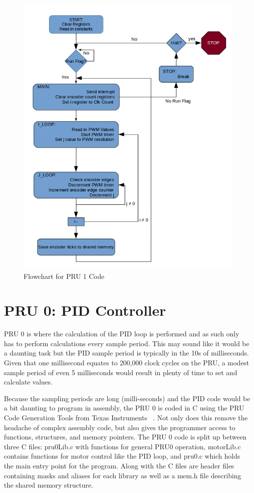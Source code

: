 \documentclass[12pt,oneside,final]{siuethesis}
\theoremstyle{definition}
\begin{document}
\begin{figure}[htbp!]
 \centering
 \includegraphics[scale=.7,keepaspectratio=true]{./images_ch3/pru1flow.jpg}
 \caption{Flowchart for PRU 1 Code}
 \label{fig:PRU1_flow}
\end{figure}


\section{PRU 0: PID Controller}

PRU 0 is where the calculation of the PID loop is performed and as such only has to perform calculations every sample period. This may sound like it would be a daunting task but the PID sample period is typically in the 10s of milliseconds. Given that one millisecond equates to 200,000 clock cycles on the PRU, a modest sample period of even 5 milliseconds would result in plenty of time to set and calculate values.  

Because the sampling periods are long (milli-seconds) and the PID code would be a bit daunting to program in assembly, the PRU 0 is coded in C using the PRU Code Generation Tools from Texas Instruments ~\cite{DEREK-MOLLOY}. Not only does this remove the headache of complex assembly code, but also gives the programmer access to functions, structures, and memory pointers. The PRU 0 code is split up between three C files: pru0Lib.c with functions for general PRU0 operation, motorLib.c contains functions for motor control like the PID loop, and pru0.c which holds the main entry point for the program. Along with the C files are header files containing masks and aliases for each library as well as a mem.h file describing the shared memory structure.
\end{document}
